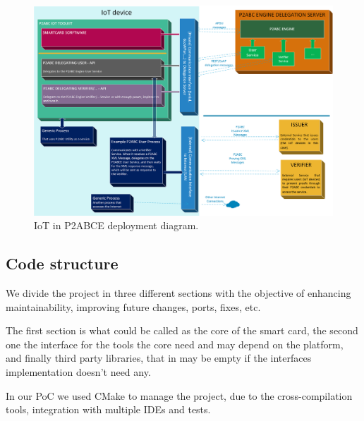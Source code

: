 \begin{figure}[bth]
	\begin{center}
		\includegraphics[width=\linewidth]{gfx/P2ABCE-IoT-color}
	\end{center}
	\caption{IoT in P2ABCE deployment diagram.}
	\label{fig:P2ABCE-IoT-color}
\end{figure}



\subsection{Code structure}


We divide the project in three different sections with the objective of enhancing maintainability, improving future changes, ports, fixes, etc.

The first section is what could be called as the core of the smart card, the second one the interface for the tools the core need and may depend on the platform, and finally third party libraries, that in may be empty if the interfaces implementation doesn't need any.


In our PoC we used CMake to manage the project, due to the cross-compilation tools, integration with multiple IDEs and tests.


